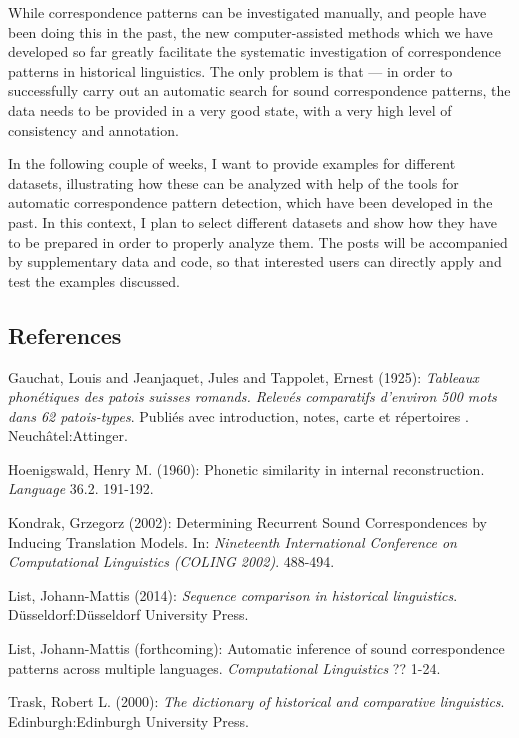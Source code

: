 \documentclass[
  a4paper,
  14pt,
  oneside,
  tablecaptionabove
]{scrbook}
\begin{document}
While correspondence patterns can be investigated manually, and people
have been doing this in the past, the new computer-assisted methods
which we have developed so far greatly facilitate the systematic
investigation of correspondence patterns in historical linguistics. The
only problem is that --- in order to successfully carry out an automatic
search for sound correspondence patterns, the data needs to be provided
in a very good state, with a very high level of consistency and
annotation.

In the following couple of weeks, I want to provide examples for
different datasets, illustrating how these can be analyzed with help of
the tools for automatic correspondence pattern detection, which have
been developed in the past. In this context, I plan to select different
datasets and show how they have to be prepared in order to properly
analyze them. The posts will be accompanied by supplementary data and
code, so that interested users can directly apply and test the examples
discussed.

\subsection*{References}

\nopagebreak\hangindent=0.7cm {\small Gauchat, Louis and Jeanjaquet, Jules and Tappolet, Ernest (1925):
\emph{Tableaux phonétiques des patois suisses romands. Relevés comparatifs
d'environ 500 mots dans 62 patois-types}. Publiés avec introduction,
notes, carte et répertoires . Neuchâtel:Attinger.}

\nopagebreak\hangindent=0.7cm {\small Hoenigswald, Henry M. (1960): Phonetic similarity in internal
reconstruction. \emph{Language} 36.2. 191-192. }

\nopagebreak\hangindent=0.7cm {\small Kondrak, Grzegorz (2002): Determining Recurrent Sound
Correspondences by Inducing Translation Models. In: \emph{Nineteenth
International Conference on Computational Linguistics (COLING 2002)}.
488-494.}

\nopagebreak\hangindent=0.7cm {\small List, Johann-Mattis (2014): \emph{Sequence comparison in historical
linguistics}. Düsseldorf:Düsseldorf University Press.}

\nopagebreak\hangindent=0.7cm {\small List, Johann-Mattis (forthcoming): Automatic inference of sound
correspondence patterns across multiple languages. \emph{Computational
Linguistics} ?? 1-24. }

\nopagebreak\hangindent=0.7cm {\small Trask, Robert L. (2000): \emph{The dictionary of historical and
comparative linguistics}. Edinburgh:Edinburgh University Press.}
\end{document}

